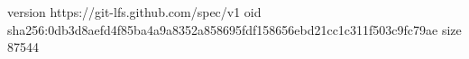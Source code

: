 version https://git-lfs.github.com/spec/v1
oid sha256:0db3d8aefd4f85ba4a9a8352a858695fdf158656ebd21cc1c311f503c9fc79ae
size 87544
